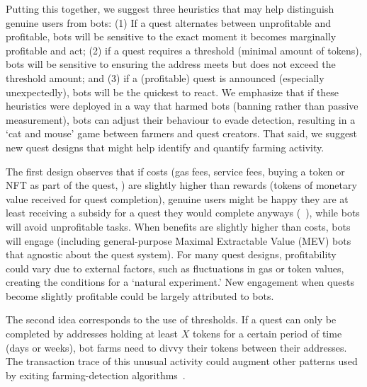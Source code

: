 Putting this together, we suggest three heuristics that may help distinguish genuine users from bots: (1) If a quest alternates between unprofitable and profitable, bots will be sensitive to the exact moment it becomes marginally profitable and act; (2) if a quest requires a threshold (minimal amount of tokens), bots will be sensitive to ensuring the address meets but does not exceed the threshold amount; and (3) if a (profitable) quest is announced (especially unexpectedly), bots will be the quickest to react. We emphasize that if these heuristics were deployed in a way that harmed bots (\eg banning rather than passive measurement), bots can adjust their behaviour to evade detection, resulting in a `cat and mouse' game between farmers and quest creators. That said, we suggest new quest designs that might help identify and quantify farming activity. 

The first design observes that if costs (\ie gas fees, service fees, buying a token or NFT as part of the quest, \etc) are slightly higher than rewards (\ie tokens of monetary value received for quest completion), genuine users might be happy they are at least receiving a subsidy for a quest they would complete anyways (\cf~\cite{LdM07}), while bots will avoid unprofitable tasks. When benefits are slightly higher than costs, bots will engage (including general-purpose Maximal Extractable Value (MEV) bots~\cite{DGK+20} that agnostic about the quest system). For many quest designs, profitability could vary due to external factors, such as fluctuations in gas or token values, creating the conditions for a `natural experiment.' New engagement when quests become slightly profitable could be largely attributed to bots.

The second idea corresponds to the use of thresholds. If a quest can only be completed by addresses holding at least $X$ tokens for a certain period of time (days or weeks), bot farms need to divvy their tokens between their addresses. The transaction trace of this unusual activity could augment other patterns used by exiting farming-detection algorithms~\cite{FTWC23,ZCH+24}.



